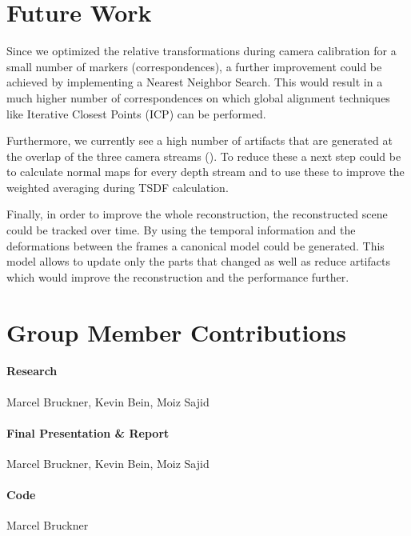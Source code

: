 \documentclass[10pt,twocolumn,letterpaper]{article}
\begin{document}
\section{Future Work}
Since we optimized the relative transformations during camera calibration for a small number of markers (correspondences), a further improvement could be achieved by implementing a Nearest Neighbor Search. This would result in a much higher number of correspondences on which global alignment techniques like Iterative Closest Points (ICP) can be performed.

Furthermore, we currently see a high number of artifacts that are generated at the overlap of the three camera streams (). To reduce these a next step could be to calculate normal maps for every depth stream and to use these to improve the weighted averaging during TSDF calculation.

Finally, in order to improve the whole reconstruction, the reconstructed scene could be tracked over time. By using the temporal information and the deformations between the frames a canonical model could be generated. This model allows to update only the parts that changed as well as reduce artifacts which would improve the reconstruction and the performance further.

\section{Group Member Contributions}
\paragraph{Research}
Marcel Bruckner, Kevin Bein, Moiz Sajid

\paragraph{Final Presentation \& Report}
Marcel Bruckner, Kevin Bein, Moiz Sajid

\paragraph{Code}
Marcel Bruckner

\newpage
\end{document}
